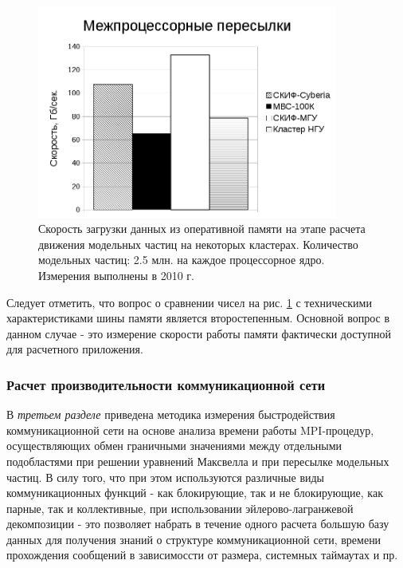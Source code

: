 \begin{figure}[htb]
	\begin{center}
		\includegraphics[height=7cm,keepaspectratio]{images/data_load_GBsec.png}
	\end{center}
	\caption{Скорость загрузки данных из оперативной памяти на этапе расчета движения модельных частиц на некоторых кластерах. Количество модельных частиц: 2.5 млн. на каждое процессорное ядро. Измерения выполнены в 2010 г.}
	\label{PIC_RAM}
\end{figure}
Следует отметить, что вопрос о сравнении чисел на рис. \ref{PIC_RAM} с техническими характеристиками шины памяти 
является второстепенным. Основной вопрос в данном случае - это измерение скорости работы памяти фактически доступной для расчетного приложения.

\subsubsection{Расчет производительности коммуникационной сети}
В \textit{третьем разделе} приведена методика измерения быстродействия коммуникационной сети на основе анализа времени работы MPI-процедур, осуществляющих обмен граничными значениями между отдельными подобластями при решении уравнений Максвелла и при пересылке модельных частиц. В силу того, что при этом используются различные виды коммуникационных функций  - как блокирующие, так и не блокирующие, как парные, так и коллективные, при использовании эйлерово-лагранжевой декомпозиции - это позволяет набрать в течение одного расчета большую базу данных для получения знаний о структуре коммуникационной сети, времени прохождения сообщений в зависимоссти от размера, системных таймаутах и пр. 

%		
%		

